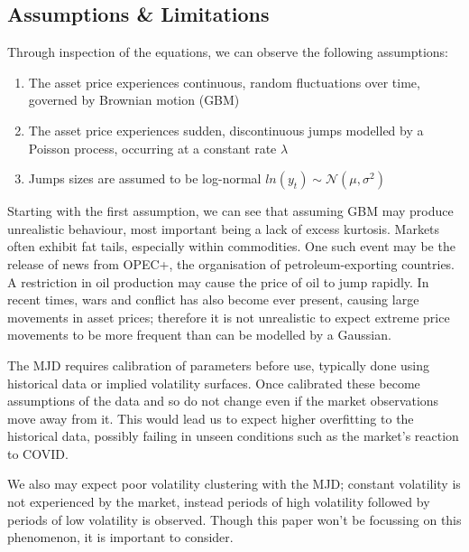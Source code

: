 \documentclass[12pt]{article}
\newcommand{\newp}
    {
    \vskip 0.5cm 
  }
\numberwithin{equation}{section}
\begin{document}
\subsection{Assumptions \& Limitations}
Through inspection of the equations, we can observe the following assumptions:
\begin{enumerate}
\item The asset price experiences continuous, random fluctuations over time,
  governed by Brownian motion (GBM)
\item The asset price experiences sudden, discontinuous jumps modelled by a 
  Poisson process, occurring at a constant rate $\lambda$
\item Jumps sizes are assumed to be log-normal $ln(y_t) \sim \mathcal{N}(\mu,\sigma^2)$
\end{enumerate}
Starting with the first assumption, we can see that assuming GBM may produce
unrealistic behaviour, most important being a lack of excess kurtosis.
Markets 
often exhibit fat tails, especially within commodities. One such event may 
be the release of news from OPEC+, the organisation of petroleum-exporting 
countries. A restriction in oil production may cause the price of oil to jump 
rapidly. In recent times, wars and conflict has also become 
ever present, causing large movements in asset prices; therefore it is not 
unrealistic to
expect extreme price movements to be more frequent than can be modelled 
by a Gaussian.
\newp
The MJD requires calibration of parameters before use, typically done using historical 
data or implied volatility surfaces. Once calibrated these become assumptions of 
the data and so do not change even if the market observations move away from it. 
This would lead us to expect higher overfitting to the historical data, possibly 
failing in unseen conditions such as the market's reaction to COVID. 
\newp 
We also may expect poor volatility clustering with the MJD; constant volatility 
is not experienced by the market, instead periods of high volatility followed 
by periods of low volatility is observed. Though this paper won't be focussing 
on this phenomenon, it is important to consider.
\end{document}
